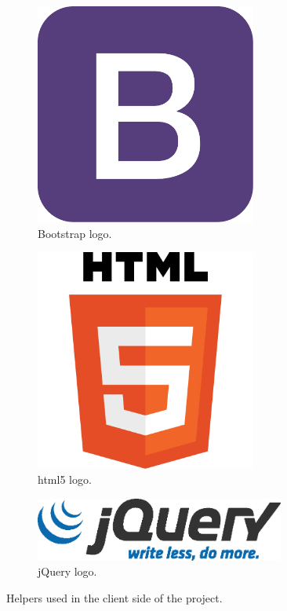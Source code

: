 \begin{figure}[!htbp]
	\centering
	\begin{subfigure}{0.25\textwidth}
		\centering
		\includegraphics[width=0.8\textwidth]{fig/bootstrap}
		\caption{Bootstrap logo.}\label{subfig:bootstrap}
	\end{subfigure}\quad
	\begin{subfigure}{0.25\textwidth}
		\centering
		\includegraphics[width=0.8\textwidth]{fig/html5}
		\caption{\acrshort{html}5 logo.}\label{subfig:html5}
	\end{subfigure}\quad
	\begin{subfigure}{0.4\textwidth}
		\centering
		\includegraphics[width=0.9\textwidth]{fig/jquery}
		\caption{jQuery logo.}\label{subfig:jquery}
	\end{subfigure}\quad
	\caption{Helpers used in the client side of the project.}
\end{figure}

